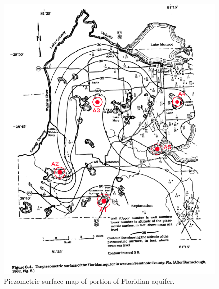 \documentclass[12pt]{article}
\begin{document}
\begin{enumerate}
\begin{enumerate}
\begin{figure}[h!]
   \includegraphics[width=6.2in]{aquifer-map.pdf} 
   \caption{Piezometric surface map of portion of Floridian aquifer.}
   \label{fig:aquifer-map.pdf}
\end{figure}
\clearpage

\end{enumerate}


\end{enumerate}
\end{document}
